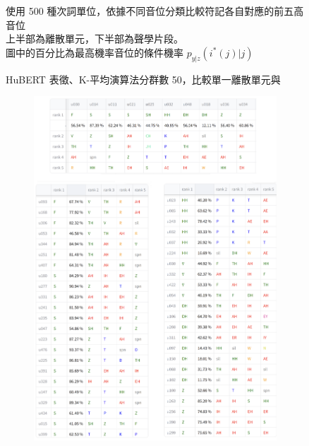{\begin{figure}
             \caption{HuBERT 表徵、K-平均演算法分群數 50，比較單一離散單元與}
             使用 500 種次詞單位，依據不同音位分類比較符記各自對應的前五高音位 \\
             上半部為離散單元，下半部為聲學片段。 \\
             圖中的百分比為最高機率音位的條件機率 $p_{y|z}(i^*(j)|j)$
                         \label{fig:hub-u050-phnobserver}
        \end{figure}
    }

        {
        \newcommand{\tempwidth}[0]{0.8\linewidth}
        \begin{figure}
        \ContinuedFloat
             \centering
             \begin{subfigure}{\textwidth}
                 \centering
                 \includegraphics[width=\tempwidth]{figures/ch4figs/fri_phn.png}

\end{subfigure}
\end{figure}}
